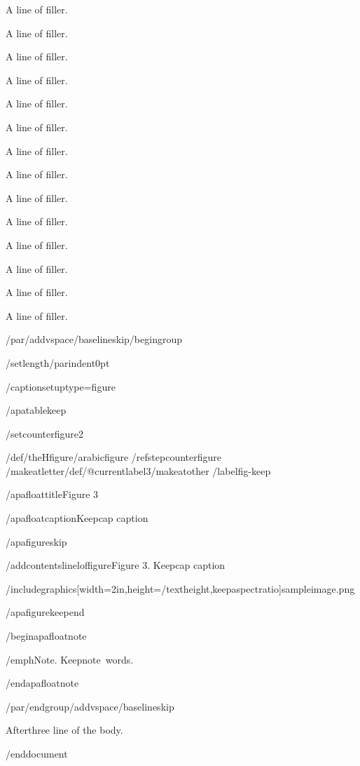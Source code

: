 A line of filler.

A line of filler.

A line of filler.

A line of filler.

A line of filler.

A line of filler.

A line of filler.

A line of filler.

A line of filler.

A line of filler.

A line of filler.

A line of filler.

A line of filler.

A line of filler.

/par/addvspace{/baselineskip}/begingroup

/setlength{/parindent}{0pt}

/captionsetup{type=figure}

/apatablekeep

/setcounter{figure}{2}

/def/theHfigure{/arabic{figure}}%
/refstepcounter{figure}%
/makeatletter/def/@currentlabel{3}/makeatother%
/label{fig-keep}

/apafloattitle{Figure 3}

/apafloatcaption{Keepcap caption}

/apafigureskip

/addcontentsline{lof}{figure}{Figure 3. Keepcap caption}

/includegraphics[width=2in,height=/textheight,keepaspectratio]{sampleimage.png}

/apafigurekeepend

/begin{apafloatnote}

/emph{Note}. Keepnote~words.

/end{apafloatnote}

/par/endgroup/addvspace{/baselineskip}

Afterthree line of the body.




/end{document}
